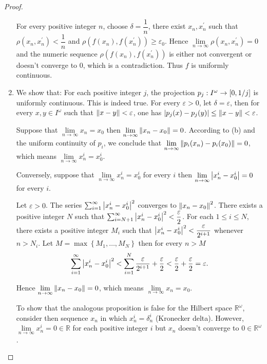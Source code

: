 \begin{proof}
\begin{enumerate}[label={(\alph*)}]
		      For every positive integer \( n \), choose \( \delta = \dfrac{1}{n} \), there exist \( x_{n}, x^{\prime}_{n} \) such that \( \rho(x_{n}, x^{\prime}_{n}) < \dfrac{1}{n} \) and \( \rho(f(x_{n}), f(x^{\prime}_{n})) \ge \varepsilon_{0} \). Hence \( \lim\limits_{n\to\infty} \rho(x_{n}, x^{\prime}_{n}) = 0 \) and the numeric sequence \( \rho(f(x_{n}), f(x^{\prime}_{n})) \) is either not convergent or doesn't converge to \( 0 \), which is a contradiction. Thus \( f \) is uniformly continuous.
		\item We show that: For each positive integer \( j \), the projection \( p_{j}: I^{\omega} \to \left\lbrack{0, 1/j}\right\rbrack \) is uniformly continuous. This is indeed true. For every \( \varepsilon > 0 \), let \( \delta = \varepsilon \), then for every \( x, y \in I^{\omega} \) such that \( \left\Vert{x - y}\right\Vert < \varepsilon \), one has \( \left\vert{p_{j}(x) - p_{j}(y)}\right\vert \le \left\Vert{x - y}\right\Vert < \varepsilon \).

		      Suppose that \( \lim\limits_{n\to\infty} x_{n} = x_{0} \) then \( \lim\limits_{n\to\infty} \left\Vert{x_{n} - x_{0}}\right\Vert = 0 \). According to (b) and the uniform continuity of \( p_{i} \), we conclude that \( \lim\limits_{n\to\infty} \left\Vert{p_{i}(x_{n}) - p_{i}(x_{0})}\right\Vert = 0 \), which means \( \lim\limits_{n\to\infty} x^{i}_{n} = x^{i}_{0} \).

		      Conversely, suppose that \( \lim\limits_{n\to\infty} x^{i}_{n} = x^{i}_{0} \) for every \( i \) then  \( \lim\limits_{n\to\infty} \left\vert{x^{i}_{n} - x^{i}_{0}}\right\vert = 0 \) for every \( i \).

		      Let \( \varepsilon > 0 \). The series \( \sum_{i=1}^{\infty} \left\vert{x^{i}_{n} - x^{i}_{0}}\right\vert^{2} \) converges to \( \left\Vert{x_{n} - x_{0}}\right\Vert^{2} \). There exists a positive integer \( N \) such that \( \sum^{\infty}_{i=N+1} \left\vert{x^{i}_{n} - x^{i}_{0}}\right\vert^{2} < \dfrac{\varepsilon}{2} \). For each \( 1 \le i \le N \), there exists a positive integer \( M_{i} \) such that \( \left\vert{x^{i}_{n} - x^{i}_{0}}\right\vert^{2} < \dfrac{\varepsilon}{2^{i+1}} \) whenever \( n > N_{i} \). Let \( M = \max\left\{ M_{1}, \ldots, M_{N} \right\} \) then for every \( n > M \)
		      \[
			      \sum_{i=1}^{\infty} \left\vert{x^{i}_{n} - x^{i}_{0}}\right\vert^{2} < \sum^{N}_{i=1} \dfrac{\varepsilon}{2^{i+1}} + \dfrac{\varepsilon}{2} < \dfrac{\varepsilon}{2} + \dfrac{\varepsilon}{2} = \varepsilon.
		      \]

		      Hence \( \lim\limits_{n\to\infty} \left\Vert{x_{n} - x_{0}}\right\Vert = 0 \), which means \( \lim\limits_{n\to\infty} x_{n} = x_{0} \).

		      To show that the analogous proposition is false for the Hilbert space \( \mathbb{R}^{\omega} \), consider then sequence \( x_{n} \) in which \( x^{i}_{n} = \delta^{i}_{n} \) (Kronecker delta). However, \( \lim\limits_{n\to\infty} x^{i}_{n} = 0 \in \mathbb{R} \) for each positive integer \( i \) but \( x_{n} \) doesn't converge to \( 0 \in \mathbb{R}^{\omega} \). \qedhere
	\end{enumerate}
\end{proof}

